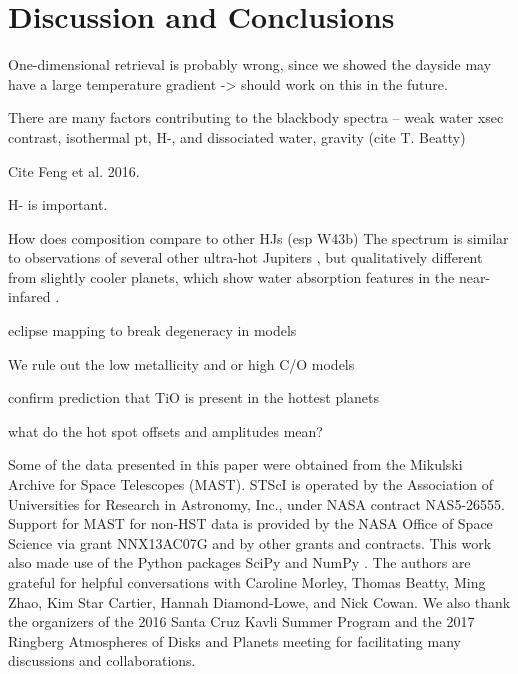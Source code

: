\documentclass[twocolumn]{aastex61}
\begin{document}
\section{Discussion and Conclusions}
\label{sec:discussion}
One-dimensional retrieval is probably wrong, since we showed the dayside may have a large temperature gradient -> should work on this in the future.


There are many factors contributing to the blackbody spectra --
weak water xsec contrast, isothermal pt, H-, and dissociated water, gravity (cite T. Beatty)

Cite Feng et al. 2016.

H- is important.

How does composition compare to other HJs (esp W43b)
The spectrum is similar to observations of several other ultra-hot Jupiters \citep[][]{arcangeli18, mansfield18}, but qualitatively different from slightly cooler planets, which show water absorption features in the near-infared \citep[e.g.][]{kreidberg14b, line16}.  

eclipse mapping to break degeneracy in models

We rule out the low metallicity and or high C/O models

confirm prediction that TiO is present in the hottest planets

what do the hot spot offsets and amplitudes mean?

\acknowledgments
Some of the data presented in this paper were obtained from the Mikulski Archive for Space Telescopes (MAST). STScI is operated by the Association of Universities for Research in Astronomy, Inc., under NASA contract NAS5-26555. Support for MAST for non-HST data is provided by the NASA Office of Space Science via grant NNX13AC07G and by other grants and contracts. This work also made use of the Python packages  SciPy and NumPy \citep{jones_scipy_2001, van2011numpy}. The authors are grateful for helpful conversations with Caroline Morley, Thomas Beatty, Ming Zhao, Kim Star Cartier, Hannah Diamond-Lowe, and Nick Cowan. We also thank the organizers of the 2016 Santa Cruz Kavli Summer Program and the 2017 Ringberg Atmospheres of Disks and Planets meeting for facilitating many discussions and collaborations.



\end{document}
